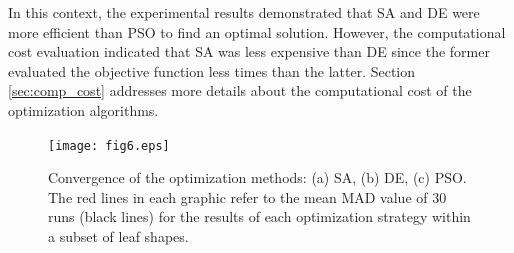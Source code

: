 {{In this context, the experimental results demonstrated that SA and DE were more efficient than PSO to find an optimal solution. However, the computational cost evaluation indicated that SA was less expensive than DE since the former evaluated the objective function less times than the latter.  Section \ref{sec:comp_cost} addresses more details about the computational cost of the optimization algorithms.

\begin{figure}[!htb]
\texttt{[image: fig6.eps]}
\caption{\label{fig:converge}Convergence of the optimization methods: (a) SA, (b) DE, (c) PSO. The red lines in each graphic refer to the mean MAD value of 30 runs (black lines) for the results of each optimization strategy within a subset of leaf shapes.}
\end{figure}

}}
